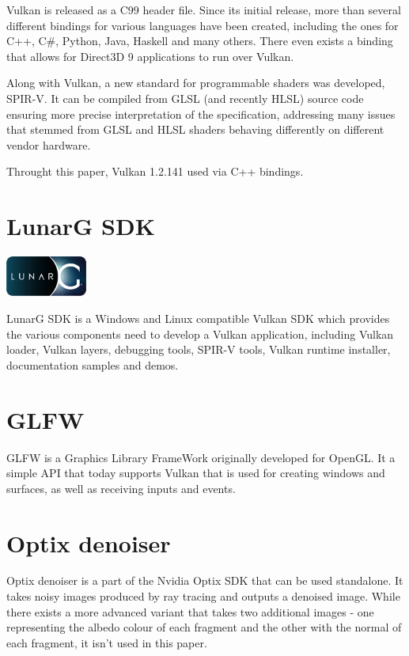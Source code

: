 \documentclass[times, utf8, zavrsni, numeric]{fer}
\begin{document}
Vulkan is released as a C99 header file. Since its initial release, more than several different bindings for various languages have been created, including the ones for C++, C\#, Python, Java, Haskell and many others. There even exists a binding that allows for Direct3D 9 applications to run over Vulkan.

Along with Vulkan, a new standard for programmable shaders was developed, SPIR-V. It can be compiled from GLSL (and recently HLSL) source code ensuring more precise interpretation of the specification, addressing many issues that stemmed from GLSL and HLSL shaders behaving differently on different vendor hardware.

Throught this paper, Vulkan 1.2.141 used via C++ bindings.

\section{LunarG SDK}

\begin{center}
\includegraphics[width=0.2\textwidth]{lunarg_logo.png}
\end{center}

LunarG SDK is a Windows and Linux compatible Vulkan SDK which provides the various components need to develop a Vulkan application, including Vulkan loader, Vulkan layers, debugging tools, SPIR-V tools, Vulkan runtime installer, documentation samples and demos.

\section{GLFW}
GLFW is a Graphics Library FrameWork originally developed for OpenGL. It a simple API that today supports Vulkan that is used for creating windows and surfaces, as well as receiving inputs and events.

\section{Optix denoiser}
Optix denoiser \cite{nvidia_optix} is a part of the Nvidia Optix SDK that can be used standalone. It takes noisy images produced by ray tracing and outputs a denoised image. While there exists a more advanced variant that takes two additional images - one representing the albedo colour of each fragment and the other with the normal of each fragment, it isn't used in this paper.
\end{document}
